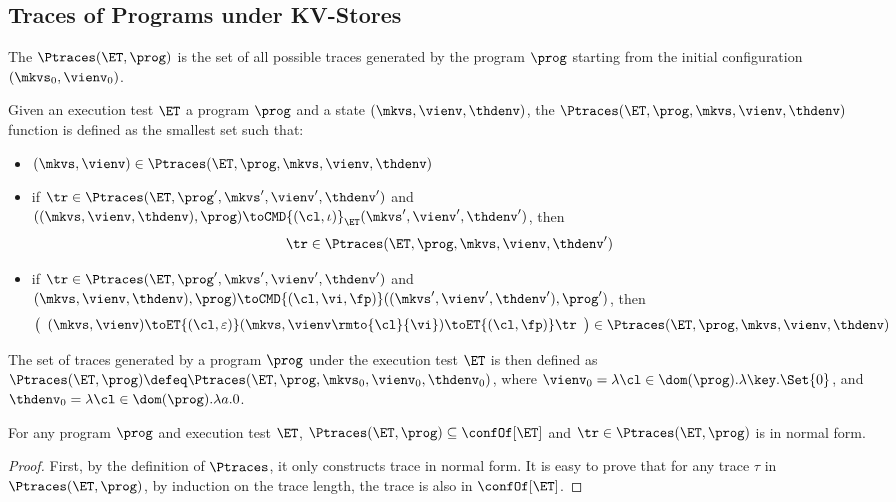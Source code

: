 \subsection{Traces of Programs under KV-Stores}
\label{sec:kv-sound-complete-theorem}

The \( \Ptraces(\ET, \prog) \) is the set of all possible traces generated by the program \( \prog \)
starting from the initial configuration \( ( \mkvs_0, \vienv_0 ) \).

\begin{definition}
Given an execution test $\ET$ a program $\prog$ and a state 
$(\mkvs, \vienv, \thdenv)$, the  $\Ptraces(\ET, \prog, \mkvs, \vienv, \thdenv)$ function
is defined as the smallest set such that:
\begin{itemize}
\item $(\mkvs, \vienv) \in \Ptraces(\ET, \prog, \mkvs, \vienv, \thdenv)$
\item if $\tr \in \Ptraces(\ET, \prog', \mkvs', \vienv',\thdenv')$
and $((\mkvs, \vienv, \thdenv) , \prog) \toCMD{(\cl, \iota)}_{\ET} (\mkvs', \vienv', \thdenv')$, 
then 
\[\tr \in \Ptraces(\ET, \prog, \mkvs, \vienv, \thdenv')\]
\item if $\tr \in \Ptraces(\ET, \prog', \mkvs', \vienv', \thdenv')$ and 
$(\mkvs, \vienv, \thdenv), \prog) \toCMD{(\cl, \vi, \fp)} ((\mkvs', \vienv', \thdenv'), \prog')$,  
then 
\[
\left( 
\begin{array}{l}
(\mkvs, \vienv) \toET{(\cl, \varepsilon)}
(\mkvs, \vienv\rmto{\cl}{\vi}) \toET{(\cl, \fp)} \tr 
\end{array}
\right) \in \Ptraces(\ET, \prog, \mkvs, \vienv, \thdenv)
\]
\end{itemize}
The set of traces generated by a program $\prog$ under the execution test $\ET$ is 
then defined as $\Ptraces(\ET, \prog) \defeq \Ptraces(\ET, \prog, \mkvs_{0}, \vienv_{0}, \thdenv_{0})$, 
where $\vienv_{0} = \lambda \cl \in \dom(\prog).\lambda \key.\Set{0}$, and 
$\thdenv_{0} = \lambda \cl \in \dom(\prog).\lambda a.0$.
\end{definition}


\begin{proposition}
\label{prop:program-trace-in-et-trace}
For any program $\prog$ and execution test $\ET$, 
$\Ptraces(\ET, \prog) \subseteq \confOf[\ET]$ and $\tr \in \Ptraces(\ET, \prog)$ is in normal form. 
\end{proposition}
\begin{proof}
    First, by the definition of \( \Ptraces \), 
    it only constructs trace in normal form.
    It is easy to prove that for any trace \( \tau \) in \( \Ptraces(\ET, \prog) \), by induction on the trace length,
    the trace is also in \( \confOf[\ET] \).
\end{proof}

